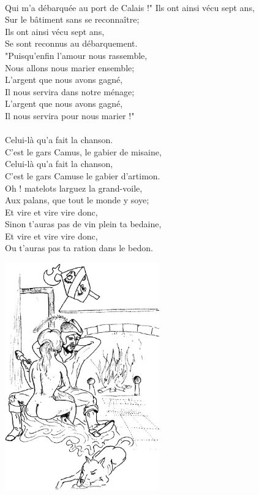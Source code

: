 \\Qui m'a débarquée au port de Calais !"
\breakpage 
Ils ont ainsi vécu sept ans,
\\Sur le bâtiment sans se reconnaître;
\\Ils ont ainsi vécu sept ans,
\\Se sont reconnus au débarquement.
\\"Puisqu'enfin l'amour nous rassemble,
\\Nous allons nous marier ensemble;
\\L'argent que nous avons gagné,
\\Il nous servira dans notre ménage;
\\L'argent que nous avons gagné,
\\Il nous servira pour nous marier !"
\\\\Celui-là qu'a fait la chanson.
\\C'est le gars Camus, le gabier de misaine,
\\Celui-là qu'a fait la chanson,
\\C'est le gars Camuse le gabier d'artimon.
\\Oh ! matelots larguez la grand-voile,
\\Aux palans, que tout le monde y soye;
\\Et vire et vire vire donc,
\\Sinon t'auras pas de vin plein ta bedaine,
\\Et vire et vire vire donc,
\\Ou t'auras pas ta ration dans le bedon.
\begin{center}
\includegraphics[width=0.5\textwidth]{images/chantons.jpg}
\end{center}

\breakpage